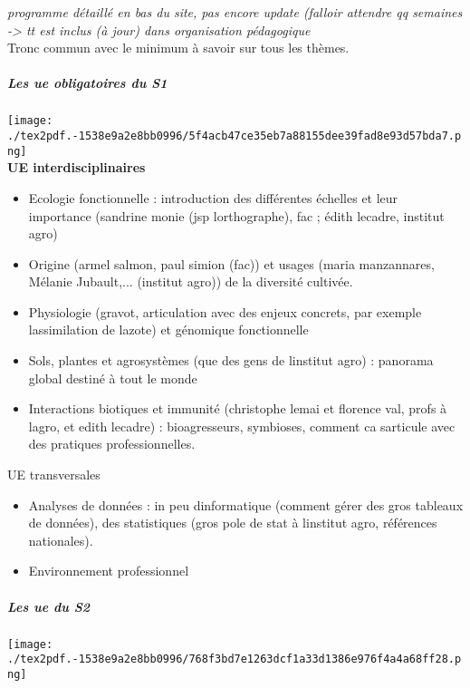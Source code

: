 \documentclass[
]{article}
\providecommand{\tightlist}{%
  \setlength{\itemsep}{0pt}\setlength{\parskip}{0pt}}
\begin{document}
\emph{programme détaillé en bas du site, pas encore update (falloir
attendre qq semaines -\textgreater{} tt est inclus (à jour) dans
organisation pédagogique}\\
Tronc commun avec le minimum à savoir sur tous les thèmes.

\hypertarget{les-ue-obligatoires-du-s1}{%
\subparagraph{Les ue obligatoires du
S1}\label{les-ue-obligatoires-du-s1}}

\texttt{[image: ./tex2pdf.-1538e9a2e8bb0996/5f4acb47ce35eb7a88155dee39fad8e93d57bda7.png]}\\
\textbf{UE interdisciplinaires}

\begin{itemize}
\tightlist
\item
  Ecologie fonctionnelle : introduction des différentes échelles et leur
  importance (sandrine monie (jsp l\textquotesingle orthographe), fac ;
  édith lecadre, institut agro)
\item
  Origine (armel salmon, paul simion (fac)) et usages (maria
  manzannares, Mélanie Jubault,... (institut agro)) de la diversité
  cultivée.
\item
  Physiologie (gravot, articulation avec des enjeux concrets, par
  exemple l\textquotesingle assimilation de l\textquotesingle azote) et
  génomique fonctionnelle
\item
  Sols, plantes et agrosystèmes (que des gens de
  l\textquotesingle institut agro) : panorama global destiné à tout le
  monde
\item
  Interactions biotiques et immunité (christophe lemai et florence val,
  profs à l\textquotesingle agro, et edith lecadre) : bioagresseurs,
  symbioses, comment ca s\textquotesingle articule avec des pratiques
  professionnelles.
\end{itemize}

UE transversales

\begin{itemize}
\tightlist
\item
  Analyses de données : in peu d\textquotesingle informatique (comment
  gérer des gros tableaux de données), des statistiques (gros pole de
  stat à l\textquotesingle institut agro, références nationales).
\item
  Environnement professionnel
\end{itemize}

\hypertarget{les-ue-du-s2}{%
\subparagraph{Les ue du S2}\label{les-ue-du-s2}}

\texttt{[image: ./tex2pdf.-1538e9a2e8bb0996/768f3bd7e1263dcf1a33d1386e976f4a4a68ff28.png]}
\end{document}
